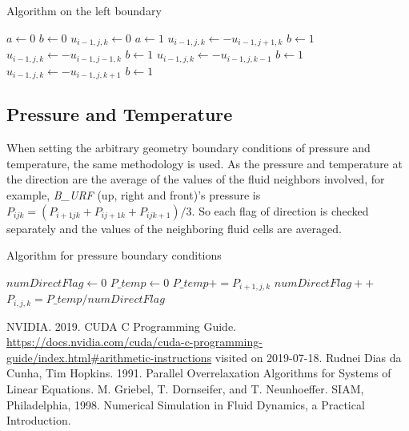 \documentclass{article}%
\begin{document}
\begin{algorithm}
\caption{Algorithm on the left boundary}\label{euclid}
\begin{algorithmic}
	\State $a\gets 0$
	\State $b\gets 0$ 
    		\State $u_{i-1,j,k}\gets 0$
    		\State $a\gets 1$
    	\EndIf
    			\State $u_{i-1,j,k}\gets -u_{i-1,j+1,k}$
    			\State $b\gets 1$
    		\EndIf	
    	\EndIf
    			\State $u_{i-1,j,k}\gets -u_{i-1,j-1,k}$
    			\State $b\gets 1$
    		\EndIf	
    	\EndIf 
    			\State $u_{i-1,j,k}\gets -u_{i-1,j,k-1}$
    			\State $b\gets 1$
    		\EndIf	
    	\EndIf    	   	
    			\State $u_{i-1,j,k}\gets -u_{i-1,j,k+1}$
    			\State $b\gets 1$
    		\EndIf	
    	\EndIf       	
\EndIf
\EndFor
\end{algorithmic}
\end{algorithm}

\newpage

\subsection{Pressure and Temperature}
When setting the arbitrary geometry boundary conditions of pressure and temperature, the same methodology is used. As the pressure and temperature at the direction are the average of the values of the fluid neighbors involved, for example, \textit{B\_URF} (up, right and front)’s pressure is $P_{ijk} = (P_{i+1jk} + P_{ij+1k} + P_{ijk+1})/3$. So each flag of direction is checked separately and the values of the neighboring fluid cells are averaged.

\begin{algorithm}
\caption{Algorithm for pressure boundary conditions}\label{euclid}
\begin{algorithmic}
	\State $numDirectFlag\gets 0$
	\State $P\_temp\gets 0$
    		\State $P\_temp += P_{i+1,j,k}$
    		\State $numDirectFlag++$
    	\EndIf
    \State $P_{i,j,k}= P\_temp / numDirectFlag$
\EndIf
\EndFor
\end{algorithmic}
\end{algorithm}



\begin{thebibliography}{999}
NVIDIA. 2019. CUDA C Programming Guide. \url{https://docs.nvidia.com/cuda/cuda-c-programming-guide/index.html#arithmetic-instructions} visited on 2019-07-18.
Rudnei Dias da Cunha, Tim Hopkins. 1991. Parallel Overrelaxation Algorithms for Systems of Linear Equations.
M. Griebel, T. Dornseifer, and T. Neunhoeffer. SIAM, Philadelphia, 1998. Numerical Simulation in Fluid Dynamics, a Practical Introduction.
\end{thebibliography}
\end{document}
